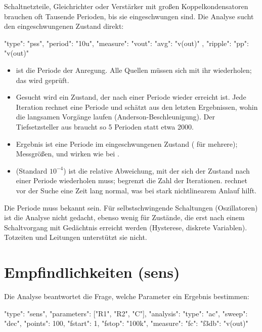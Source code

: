 Schaltnetzteile, Gleichrichter oder Verstärker mit großen
Koppelkondensatoren brauchen oft Tausende Perioden, bis sie eingeschwungen
sind. Die Analyse  sucht den eingeschwungenen Zustand direkt:

\begin{json}
{ "type": "pss", "period": "10u",
  "measure": { "vout": { "avg": "v(out)" }, "ripple": { "pp": "v(out)" } } }
\end{json}

\begin{itemize}
  \item {} ist die Periode der Anregung. Alle Quellen müssen sich
    mit ihr wiederholen; das wird geprüft.
  \item Gesucht wird ein Zustand, der nach einer Periode wieder erreicht
    ist. Jede Iteration rechnet eine Periode und schätzt aus den letzten
    Ergebnissen, wohin die langsamen Vorgänge laufen
    (Anderson-Beschleunigung). Der Tiefsetzsteller aus
     braucht so 5 Perioden statt etwa
    2000.
  \item Ergebnis ist eine Periode im eingeschwungenen Zustand
    ( für mehrere); Messgrößen,  und
     wirken wie bei .
  \item {} (Standard $10^{-4}$) ist die relative Abweichung, mit
    der sich der Zustand nach einer Periode wiederholen muss;
     begrenzt die Zahl der Iterationen. 
    rechnet vor der Suche eine Zeit lang normal, was bei stark
    nichtlinearem Anlauf hilft.
\end{itemize}

Die Periode muss bekannt sein. Für selbstschwingende Schaltungen
(Oszillatoren) ist die Analyse nicht gedacht, ebenso wenig für Zustände, die
erst nach einem Schaltvorgang mit Gedächtnis erreicht werden (Hysterese,
diskrete Variablen). Totzeiten und Leitungen unterstützt sie nicht.

\section{Empfindlichkeiten (sens)}

Die Analyse  beantwortet die Frage, welche Parameter ein
Ergebnis bestimmen:

\begin{json}
{ "type": "sens", "parameters": ["R1", "R2", "C"],
  "analysis": { "type": "ac", "sweep": "dec", "points": 100, "fstart": 1, "fstop": "100k",
                "measure": { "fc": { "f3db": "v(out)" } } } }
\end{json}

